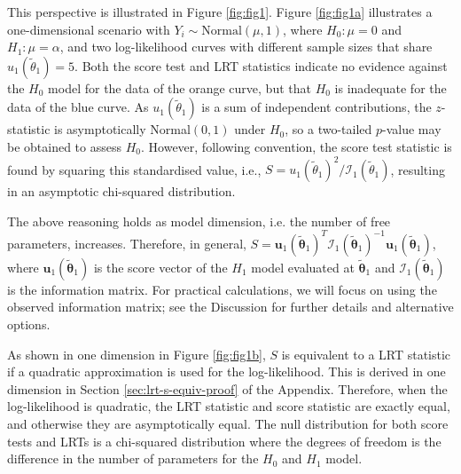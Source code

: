 \documentclass{article}
\newcommand{\thetaOneTilde}{\tilde{\boldsymbol{\theta}}_1}
\newcommand{\thetaOneTildeOD}{\tilde{\theta}_1} %
\newcommand{\scoreU}{\boldsymbol{u}_1 (\thetaOneTilde)}
\newcommand{\scoreUOneDim}{u_1 (\thetaOneTildeOD)}
\newcommand{\scoreI}{\mathcal{I}_1 (\thetaOneTilde)}
\begin{document}
This perspective is illustrated in Figure \ref{fig:fig1}. Figure
\ref{fig:fig1a} illustrates a one-dimensional scenario with 
$Y_i \sim \text{Normal}(\mu, 1)$, where
$H_0: \mu = 0$ and $H_1: \mu = \alpha$, and two log-likelihood curves
with different sample sizes that share $\scoreUOneDim=5$. Both the
score test and LRT statistics indicate no evidence against the
$H_0$ model for the data of the orange curve, but that $H_0$ is
inadequate for the data of the blue 
curve. As $\scoreUOneDim$ is a sum of independent contributions, the
$z$-statistic is asymptotically Normal$(0,1)$ under $H_0$, so a two-tailed 
$p$-value may be obtained to assess $H_0$. However, following convention, the score test
statistic is found by squaring this standardised value,
i.e., $S=\scoreUOneDim^2/\mathcal{I}_1(\thetaOneTildeOD)$,
resulting in an asymptotic chi-squared distribution.

The above reasoning holds as model dimension, i.e. the number of free
parameters, increases. Therefore, in general,
$S = \scoreU^T \scoreI^{-1}
\scoreU$, where $\scoreU$ is the score vector of the $H_1$ model
evaluated at $\thetaOneTilde$ and $\scoreI$ is the information
matrix. For practical calculations, we will focus on using the observed information
matrix; see the Discussion for further details and alternative options.


As shown in one dimension in Figure \ref{fig:fig1b}, $S$ is equivalent
to a LRT statistic if a quadratic approximation is used for the log-likelihood.
This is derived in one dimension in Section \ref{sec:lrt-s-equiv-proof} of
the Appendix. Therefore, when the log-likelihood is quadratic, the LRT
statistic and score statistic are exactly equal, and otherwise they are
asymptotically equal. The null distribution for both score tests and
LRTs is a chi-squared
distribution where the degrees of freedom is the difference in the
number of parameters for the $H_0$ and $H_1$ model.
\end{document}
